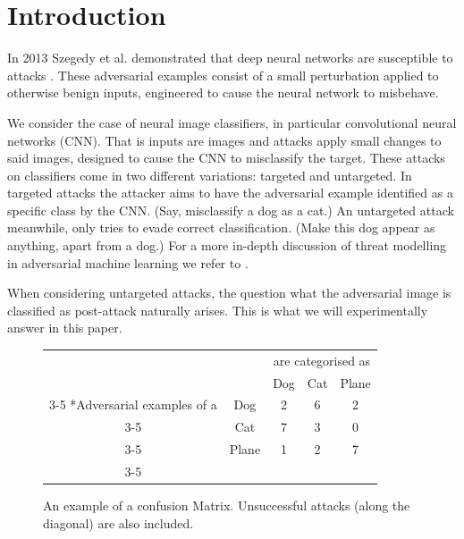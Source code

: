 \documentclass{article}
\begin{document}
\section{Introduction}



In 2013 Szegedy et al. demonstrated that deep neural networks are susceptible to attacks \cite{Szegedy13}. These adversarial examples consist of a small perturbation applied to otherwise benign inputs, engineered to cause the neural network to misbehave.

We consider the case of neural image classifiers, in particular convolutional neural networks \cite{lecun1999object} (CNN).
That is inputs are images and attacks apply small changes to said images, designed to cause the CNN to misclassify the target. These attacks on classifiers come in two different variations: targeted and untargeted.
In targeted attacks the attacker aims to have the adversarial example identified as a specific class by the CNN. (Say, misclassify a dog as a cat.)
An untargeted attack meanwhile, only tries to evade correct classification. (Make this dog appear as anything, apart from a dog.)
For a more in-depth discussion of threat modelling in adversarial machine learning we refer to \cite{biggio2018wild}.

When considering untargeted attacks, the question what the adversarial image is classified as post-attack naturally arises. This is what we will experimentally answer in this paper.

\begin{figure}[h]
	\begin{tabular}{cc|c|c|c|}
		& \multicolumn{1}{c}{} & \multicolumn{3}{c}{are categorised as}\\
		& \multicolumn{1}{c}{} & \multicolumn{1}{c}{Dog}  & \multicolumn{1}{c}{Cat} & \multicolumn{1}{c}{Plane} \\\cline{3-5}
		\multirow{3}*{Adversarial examples of a}  & Dog & 2 & 6 & 2\\\cline{3-5}
		& Cat & 7 & 3 &  0 \\\cline{3-5}
		& Plane & 1 & 2 &  7 \\\cline{3-5}
	\end{tabular}

	\caption{An example of a confusion Matrix. Unsuccessful attacks (along the diagonal) are also included.}
	\label{fig:matrixexample}
\end{figure}
\end{document}
